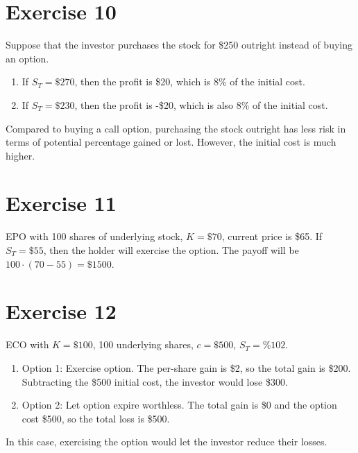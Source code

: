 \documentclass{article}
\begin{document}
\section*{Exercise 10}
\begin{flushleft}
    Suppose that the investor purchases the stock for \$250 outright instead of buying an option.
    \begin{enumerate}
        \item If $S_T = \$270$, then the profit is \$20, which is 8\% of the initial cost.
        \item If $S_T = \$230$, then the profit is -\$20, which is also 8\% of the initial cost.
    \end{enumerate}
    Compared to buying a call option, purchasing the stock outright has less risk in terms of potential percentage gained or lost. However, the initial cost is much higher.
\end{flushleft}

\section*{Exercise 11}
\begin{flushleft}
    EPO with 100 shares of underlying stock, $K = \$70$, current price is \$65. If $S_T = \$55$, then the holder will exercise the option.
    The payoff will be $100 \cdot (70 - 55) = \$1500$.
\end{flushleft}

\section*{Exercise 12}
\begin{flushleft}
    ECO with $K = \$100$, 100 underlying shares, $c = \$500$, $S_T = \%102$.
    \begin{enumerate}
        \item Option 1: Exercise option. The per-share gain is \$2, so the total gain is \$200. Subtracting the \$500 initial cost, the investor would lose \$300.
        \item Option 2: Let option expire worthless. The total gain is \$0 and the option cost \$500, so the total loss is \$500.
    \end{enumerate}
    In this case, exercising the option would let the investor reduce their losses.
\end{flushleft}
\end{document}
